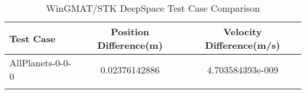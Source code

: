 \begin{table}[htbp!]
\centering
\caption{ WinGMAT/STK DeepSpace Test Case Comparison}
      \begin{tabular}{lcc}
      \hline\hline
          Test Case & Position Difference(m) & Velocity Difference(m/s) \\
         \hline
         AllPlanets-0-0-0 & 0.02376142886 & 4.703584393e-009 \\
      \hline\hline
      \label{Table: DeepSpace WinGMAT-STK Table} 
\end{tabular}
\end{table}
